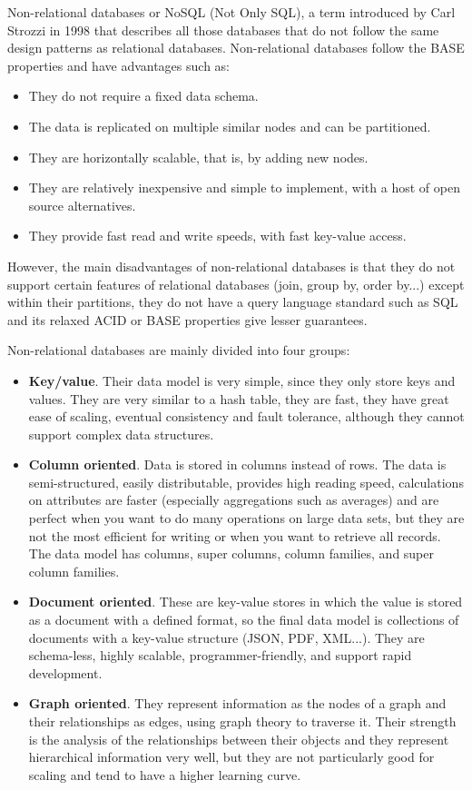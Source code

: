 \nonzeroparskip Non-relational databases or NoSQL (Not Only SQL), a term introduced by Carl Strozzi in 1998 that describes all those databases that do not follow the same design patterns as relational databases. Non-relational databases follow the BASE properties and have advantages such as:
\begin{itemize}
	\item They do not require a fixed data schema.
	\item The data is replicated on multiple similar nodes and can be partitioned.
	\item They are horizontally scalable, that is, by adding new nodes.
	\item They are relatively inexpensive and simple to implement, with a host of open source alternatives.
	\item They provide fast read and write speeds, with fast key-value access.
\end{itemize}

\nonzeroparskip However, the main disadvantages of non-relational databases is that they do not support certain features of relational databases (join, group by, order by...) except within their partitions, they do not have a query language standard such as SQL and its relaxed ACID or BASE properties give lesser guarantees.

\nonzeroparskip Non-relational databases are mainly divided into four groups:
\begin{itemize}
	\item \textbf{Key/value}. Their data model is very simple, since they only store keys and values. They are very similar to a hash table, they are fast, they have great ease of scaling, eventual consistency and fault tolerance, although they cannot support complex data structures.
	\item \textbf{Column oriented}. Data is stored in columns instead of rows. The data is semi-structured, easily distributable, provides high reading speed, calculations on attributes are faster (especially aggregations such as averages) and are perfect when you want to do many operations on large data sets, but they are not the most efficient for writing or when you want to retrieve all records. The data model has columns, super columns, column families, and super column families.
	\item \textbf{Document oriented}. These are key-value stores in which the value is stored as a document with a defined format, so the final data model is collections of documents with a key-value structure (JSON, PDF, XML...). They are schema-less, highly scalable, programmer-friendly, and support rapid development.
	\item \textbf{Graph oriented}. They represent information as the nodes of a graph and their relationships as edges, using graph theory to traverse it. Their strength is the analysis of the relationships between their objects and they represent hierarchical information very well, but they are not particularly good for scaling and tend to have a higher learning curve.
\end{itemize}

